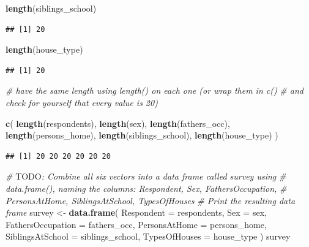 \documentclass[
]{article}
\newenvironment{Shaded}{\begin{snugshade}}{\end{snugshade}}
\newcommand{\AlertTok}[1]{\textcolor[rgb]{0.94,0.16,0.16}{#1}}
\newcommand{\AttributeTok}[1]{\textcolor[rgb]{0.13,0.29,0.53}{#1}}
\newcommand{\CommentTok}[1]{\textcolor[rgb]{0.56,0.35,0.01}{\textit{#1}}}
\newcommand{\FunctionTok}[1]{\textcolor[rgb]{0.13,0.29,0.53}{\textbf{#1}}}
\newcommand{\NormalTok}[1]{#1}
\newcommand{\OtherTok}[1]{\textcolor[rgb]{0.56,0.35,0.01}{#1}}
\begin{document}
\begin{Shaded}
\begin{Highlighting}[]
\FunctionTok{length}\NormalTok{(siblings\_school)}
\end{Highlighting}
\end{Shaded}

\begin{verbatim}
## [1] 20
\end{verbatim}

\begin{Shaded}
\begin{Highlighting}[]
\FunctionTok{length}\NormalTok{(house\_type)}
\end{Highlighting}
\end{Shaded}

\begin{verbatim}
## [1] 20
\end{verbatim}

\begin{Shaded}
\begin{Highlighting}[]
\CommentTok{\# have the same length using length() on each one (or wrap them in c()}
\CommentTok{\# and check for yourself that every value is 20)}

\FunctionTok{c}\NormalTok{(}
  \FunctionTok{length}\NormalTok{(respondents), }
  \FunctionTok{length}\NormalTok{(sex), }
  \FunctionTok{length}\NormalTok{(fathers\_occ), }
  \FunctionTok{length}\NormalTok{(persons\_home), }
  \FunctionTok{length}\NormalTok{(siblings\_school), }
  \FunctionTok{length}\NormalTok{(house\_type)}
\NormalTok{)}
\end{Highlighting}
\end{Shaded}

\begin{verbatim}
## [1] 20 20 20 20 20 20
\end{verbatim}

\begin{Shaded}
\begin{Highlighting}[]
\CommentTok{\# }\AlertTok{TODO}\CommentTok{: Combine all six vectors into a data frame called survey using}
\CommentTok{\# data.frame(), naming the columns: Respondent, Sex, FathersOccupation,}
\CommentTok{\# PersonsAtHome, SiblingsAtSchool, TypesOfHouses}
\CommentTok{\# Print the resulting data frame}
\NormalTok{survey }\OtherTok{\textless{}{-}} \FunctionTok{data.frame}\NormalTok{(}
  \AttributeTok{Respondent =}\NormalTok{ respondents,}
  \AttributeTok{Sex =}\NormalTok{ sex,}
  \AttributeTok{FathersOccupation =}\NormalTok{ fathers\_occ,}
  \AttributeTok{PersonsAtHome =}\NormalTok{ persons\_home,}
  \AttributeTok{SiblingsAtSchool =}\NormalTok{ siblings\_school,}
  \AttributeTok{TypesOfHouses =}\NormalTok{ house\_type}
\NormalTok{)}
\NormalTok{survey}
\end{Highlighting}
\end{Shaded}
\end{document}

